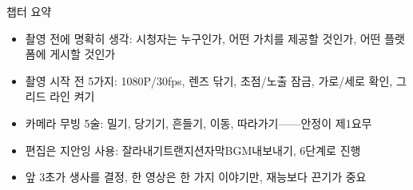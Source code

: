 \begin{tcbsummary}{챕터 요약}
\begin{itemize}
  \item 촬영 전에 명확히 생각: 시청자는 누구인가, 어떤 가치를 제공할 것인가, 어떤 플랫폼에 게시할 것인가
  \item 촬영 시작 전 5가지: 1080P/30fps, 렌즈 닦기, 초점/노출 잠금, 가로/세로 확인, 그리드 라인 켜기
  \item 카메라 무빙 5술: 밀기, 당기기, 흔들기, 이동, 따라가기——안정이 제1요무
  \item 편집은 지안잉 사용: 잘라내기트랜지션자막BGM내보내기, 6단계로 진행
  \item 앞 3초가 생사를 결정, 한 영상은 한 가지 이야기만, 재능보다 끈기가 중요
\end{itemize}

\end{tcbsummary}

